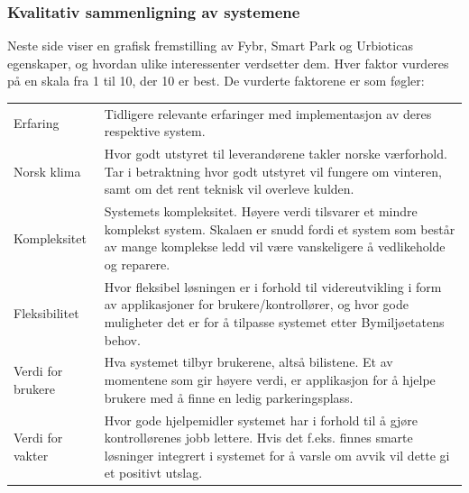\documentclass[xetex]{beamer}
\begin{document}
\begin{frame}\label{fr:kvalitativ_sammenligning}
	\frametitle{Kvalitativ sammenligning av systemene}
	Neste side viser en grafisk fremstilling av Fybr, Smart Park og Urbioticas egenskaper, og hvordan ulike interessenter verdsetter dem. Hver faktor vurderes på en skala fra 1 til 10, der 10 er best. De vurderte faktorene er som føgler:
	
	\begin{tabular}{lp{8.5cm}}
	\alert{Erfaring} 			& Tidligere relevante erfaringer med implementasjon av deres respektive system.  \\ [1em]
	\alert{Norsk klima} 		& Hvor godt utstyret til leverandørene takler norske værforhold. Tar i betraktning hvor godt utstyret vil fungere om vinteren, samt om det rent teknisk vil overleve kulden.
 \\ [1em]
	\alert{Kompleksitet} 		& Systemets kompleksitet. Høyere verdi tilsvarer et mindre komplekst system. Skalaen er snudd fordi et system som består av mange komplekse ledd vil være vanskeligere å vedlikeholde og reparere.
 \\ [1em]
	\alert{Fleksibilitet} 		&Hvor fleksibel løsningen er i forhold til videreutvikling i form av applikasjoner for brukere/kontrollører, og hvor gode muligheter det er for å tilpasse systemet etter Bymiljøetatens behov.
 \\ [1em]
	\alert{Verdi for brukere} 	& Hva systemet tilbyr brukerene, altså bilistene. Et av momentene  som gir høyere verdi, er applikasjon for å hjelpe brukere med å finne en ledig parkeringsplass.
 \\ [1em]
	\alert{Verdi for vakter} 	& Hvor gode hjelpemidler systemet har i forhold til å gjøre kontrollørenes jobb lettere. Hvis det f.eks. finnes smarte løsninger integrert i systemet for å varsle om avvik vil dette gi et positivt utslag.
 \\
	\end{tabular}
\end{frame}
\end{document}
